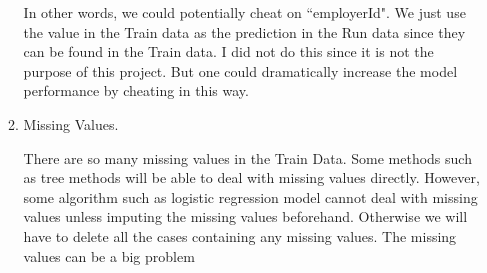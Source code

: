 \documentclass[12pt]{report}
\begin{document}
\begin{enumerate}
\begin{enumerate}
		In other words, we could potentially cheat on ``employerId". We just use the value in the Train data as the prediction in the Run data since they can be found in the Train data. I did not do this since it is not the purpose of this project. But one could dramatically increase the model performance by cheating in this way.
		
		\item Missing Values.
		
		There are so many missing values in the Train Data. Some methods such as tree methods will be able to deal with missing values directly. However, some algorithm such as logistic regression model cannot deal with missing values unless imputing the missing values beforehand. Otherwise we will have to delete all the cases containing any missing values. The missing values can be a big problem
		

\end{enumerate}
\end{enumerate}
\end{document}
